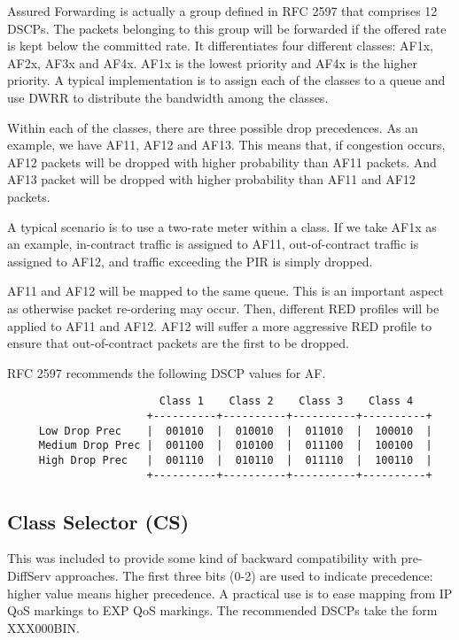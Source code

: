 Assured Forwarding is actually a group defined in RFC 2597 \cite{rfc2597} that comprises 12 DSCPs.
The packets belonging to this group will be forwarded if the offered rate is kept below the committed rate.
It differentiates four different classes: AF1x, AF2x, AF3x and AF4x.
AF1x is the lowest priority and AF4x is the higher priority.
A typical implementation is to assign each of the classes to a queue and use DWRR to distribute the bandwidth among the classes.

Within each of the classes, there are three possible drop precedences.
As an example, we have AF11, AF12 and AF13.
This means that, if congestion occurs, AF12 packets will be dropped with higher probability than AF11 packets.
And AF13 packet will be dropped with higher probability than AF11 and AF12 packets.

A typical scenario is to use a two-rate meter within a class.
If we take AF1x as an example, in-contract traffic is assigned to AF11, out-of-contract traffic is assigned to AF12, and traffic exceeding the PIR is simply dropped.

AF11 and AF12 will be mapped to the same queue.
This is an important aspect as otherwise packet re-ordering may occur.
Then, different RED profiles will be applied to AF11 and AF12.
AF12 will suffer a more aggressive RED profile to ensure that out-of-contract packets are the first to be dropped.

RFC 2597 \cite{rfc2597} recommends the following DSCP values for AF.

{\scriptsize 
\begin{verbatim}
                        Class 1    Class 2    Class 3    Class 4
                      +----------+----------+----------+----------+
     Low Drop Prec    |  001010  |  010010  |  011010  |  100010  |
     Medium Drop Prec |  001100  |  010100  |  011100  |  100100  |
     High Drop Prec   |  001110  |  010110  |  011110  |  100110  |
                      +----------+----------+----------+----------+
\end{verbatim}
}

\subsection{Class Selector (CS)}
This was included to provide some kind of backward compatibility with pre-DiffServ approaches.
The first three bits (0-2) are used to indicate precedence: higher value means higher precedence.
A practical use is to ease mapping from IP QoS markings to EXP QoS markings.
The recommended DSCPs take the form XXX000BIN.

